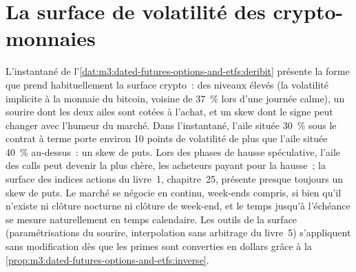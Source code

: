 \begin{omfigure}

\label{fig:m3:dated-futures-options-and-etfs:deltas}
\end{omfigure}

\section{La surface de volatilité des crypto-monnaies}

L'instantané de l'\cref{dat:m3:dated-futures-options-and-etfs:deribit} présente la forme que prend habituellement la surface crypto~: des niveaux élevés
(la volatilité implicite à la monnaie du bitcoin, voisine de 37~\% lors d'une journée calme), un sourire dont les deux ailes sont cotées à l'achat, et un skew dont le signe peut
changer avec l'humeur du marché. Dans l'instantané, l'aile située 30~\% sous le contrat à terme porte environ 10 points de volatilité de plus que
l'aile située 40~\% au-dessus~: un skew de puts. Lors des phases de hausse spéculative, l'aile des calls peut devenir la plus chère, les acheteurs payant pour la hausse~; la
surface des indices actions du livre~1, chapitre~25, présente presque toujours un skew de puts. Le marché se négocie en continu, week-ends
compris, si bien qu'il n'existe ni clôture nocturne ni clôture de week-end, et le temps jusqu'à l'échéance se mesure naturellement en temps calendaire.
Les outils de la surface (paramétrisations du sourire, interpolation sans arbitrage du livre~5) s'appliquent sans modification dès que les primes sont
converties en dollars grâce à la \cref{prop:m3:dated-futures-options-and-etfs:inverse}.

